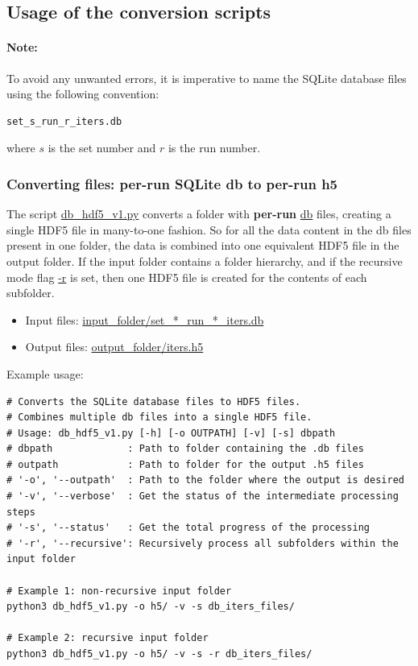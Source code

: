 \documentclass[10pt,a4paper]{article}
\begin{document}
\subsection{Usage of the conversion scripts}

\paragraph{Note:}
To avoid any unwanted errors, it is imperative to name the SQLite database files using the following convention:

\begin{verbatim}
set_s_run_r_iters.db
\end{verbatim}
where $s$ is the set number and $r$ is the run number.
 
\subsubsection{Converting files: per-run SQLite db to per-run h5}
The script \url{db_hdf5_v1.py} converts a folder with \textbf{per-run} \url{db} files, creating a single HDF5 file in many-to-one fashion.
So for all the data content in the db files present in one folder, the data is combined into one equivalent HDF5 file in the output folder. 
If the input folder contains a folder hierarchy, and if the recursive mode flag \url{-r} is set, then one HDF5 file is created for the contents of each subfolder.

\begin{itemize}
\item Input files: \url{input_folder/set_*_run_*_iters.db}

\item Output files: \url{output_folder/iters.h5}
\end{itemize}

Example usage:
\begin{verbatim}
# Converts the SQLite database files to HDF5 files.
# Combines multiple db files into a single HDF5 file.
# Usage: db_hdf5_v1.py [-h] [-o OUTPATH] [-v] [-s] dbpath
# dbpath             : Path to folder containing the .db files
# outpath            : Path to folder for the output .h5 files
# '-o', '--outpath'  : Path to the folder where the output is desired
# '-v', '--verbose'  : Get the status of the intermediate processing steps
# '-s', '--status'   : Get the total progress of the processing
# '-r', '--recursive': Recursively process all subfolders within the input folder

# Example 1: non-recursive input folder
python3 db_hdf5_v1.py -o h5/ -v -s db_iters_files/

# Example 2: recursive input folder
python3 db_hdf5_v1.py -o h5/ -v -s -r db_iters_files/
\end{verbatim}
\end{document}
